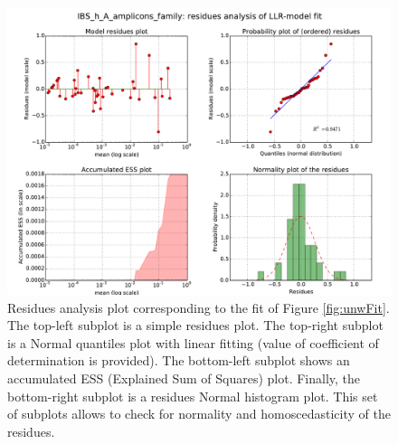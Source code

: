 \documentclass[12pt,oneside,letterpaper]{article}
\begin{document}
\begin{figure}
	\centering
	\includegraphics[width=\textwidth]{results/fits/IBS_h_A_amplicons_family_stdVSmean_LLR_RES.pdf}
	\caption{Residues analysis plot corresponding to the fit of Figure \ref{fig:unwFit}. The top-left subplot is a simple residues plot. The top-right subplot is a Normal quantiles plot with linear fitting (value of coefficient of determination is provided). The bottom-left subplot shows an accumulated ESS (Explained Sum of Squares) plot. Finally, the bottom-right subplot is a residues Normal histogram plot. This set of subplots allows to check for normality and homoscedasticity of the residues.}
	\label{fig:unwRes}
\end{figure}
\end{document}
